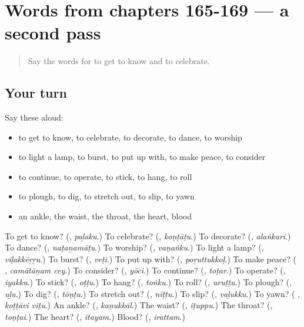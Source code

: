 \section[(dialogue)]{Words from chapters 165-169 — a second pass}

\label{lesson:TA-R169-second-pass-words-from-chapters-165-169}



\begin{quote}
Say the words for to get to know and to celebrate.
\end{quote}

\subsection*{Your turn}
Say these aloud:

\begin{itemize}
\raggedright
  \item to get to know, to celebrate, to decorate, to dance, to worship
  \item to light a lamp, to burst, to put up with, to make peace, to consider
  \item to continue, to operate, to stick, to hang, to roll
  \item to plough, to dig, to stretch out, to slip, to yawn
  \item an ankle, the waist, the throat, the heart, blood
\end{itemize}

\begin{tcolorbox}[breakable,colback=teal!4,colframe=teal!35!black,title={Before you move on}]
To get to know? (\textbf{}, \emph{paḻaku}.) To celebrate? (\textbf{}, \emph{koṇṭāṭu}.) To decorate? (\textbf{}, \emph{alaṅkari}.) To dance? (\textbf{}, \emph{naṭaṉamāṭu}.) To worship? (\textbf{}, \emph{vaṇaṅku}.) To light a lamp? (\textbf{}, \emph{viḷakkēṟṟu}.) To burst? (\textbf{}, \emph{veṭi}.) To put up with? (\textbf{}, \emph{poṟuttukkoḷ}.) To make peace? (\textbf{ }, \emph{camātāṉam cey}.) To consider? (\textbf{}, \emph{yōci}.) To continue? (\textbf{}, \emph{toṭar}.) To operate? (\textbf{}, \emph{iyakku}.) To stick? (\textbf{}, \emph{oṭṭu}.) To hang? (\textbf{}, \emph{toṅku}.) To roll? (\textbf{}, \emph{uruṭṭu}.) To plough? (\textbf{}, \emph{uḻu}.) To dig? (\textbf{}, \emph{tōṇṭu}.) To stretch out? (\textbf{}, \emph{nīṭṭu}.) To slip? (\textbf{}, \emph{vaḻukku}.) To yawn? (\textbf{ }, \emph{koṭṭāvi viṭu}.) An ankle? (\textbf{}, \emph{kaṇukkāl}.) The waist? (\textbf{}, \emph{iṭuppu}.) The throat? (\textbf{}, \emph{toṇṭai}.) The heart? (\textbf{}, \emph{itayam}.) Blood? (\textbf{}, \emph{irattam}.)
\end{tcolorbox}
